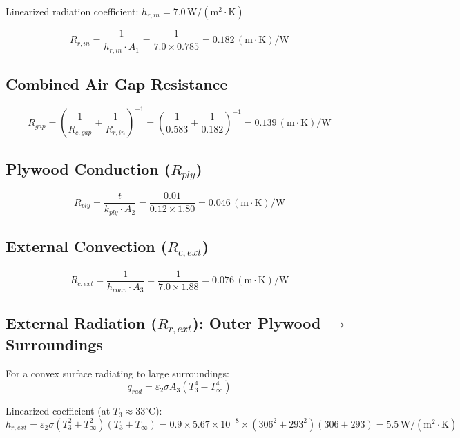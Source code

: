 \documentclass[11pt]{article}
\newcommand{\degC}{$^\circ$C}
\newcommand{\unit}[1]{\,\mathrm{#1}}
\begin{document}
Linearized radiation coefficient: $h_{r,in} = 7.0\unit{W/(m^2 \cdot K)}$

\begin{equation}
    R_{r,in} = \frac{1}{h_{r,in} \cdot A_1} = \frac{1}{7.0 \times 0.785} = \boxed{0.182\unit{(m \cdot K)/W}}
\end{equation}

\subsection{Combined Air Gap Resistance}

\begin{equation}
    R_{gap} = \left(\frac{1}{R_{c,gap}} + \frac{1}{R_{r,in}}\right)^{-1} = \left(\frac{1}{0.583} + \frac{1}{0.182}\right)^{-1} = \boxed{0.139\unit{(m \cdot K)/W}}
\end{equation}

\subsection{Plywood Conduction ($R_{ply}$)}

\begin{equation}
    R_{ply} = \frac{t}{k_{ply} \cdot A_2} = \frac{0.01}{0.12 \times 1.80} = \boxed{0.046\unit{(m \cdot K)/W}}
\end{equation}

\subsection{External Convection ($R_{c,ext}$)}

\begin{equation}
    R_{c,ext} = \frac{1}{h_{conv} \cdot A_3} = \frac{1}{7.0 \times 1.88} = \boxed{0.076\unit{(m \cdot K)/W}}
\end{equation}

\subsection{External Radiation ($R_{r,ext}$): Outer Plywood $\to$ Surroundings}

For a convex surface radiating to large surroundings:
\begin{equation}
    q_{rad} = \varepsilon_2 \sigma A_3 (T_3^4 - T_\infty^4)
\end{equation}

Linearized coefficient (at $T_3 \approx 33$\degC):
\begin{equation}
    h_{r,ext} = \varepsilon_2 \sigma (T_3^2 + T_\infty^2)(T_3 + T_\infty) = 0.9 \times 5.67 \times 10^{-8} \times (306^2 + 293^2)(306 + 293) = \boxed{5.5\unit{W/(m^2 \cdot K)}}
\end{equation}
\end{document}
